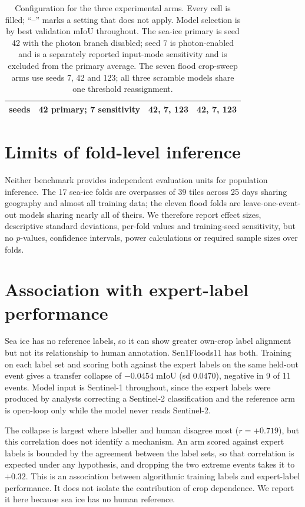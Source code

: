 \documentclass[10pt,twocolumn,letterpaper]{article}
\begin{document}
\begin{table}[t]
\begin{tabular}{llll}
seeds              & 42 primary; 7 sensitivity & 42, 7, 123      & 42, 7, 123 \\
\bottomrule
\end{tabular}
\caption{Configuration for the three experimental arms. Every cell is filled;
``--'' marks a setting that does not apply. Model selection is by best validation
mIoU throughout. The sea-ice
primary is seed 42 with the photon branch disabled; seed 7 is photon-enabled and is
a separately reported input-mode sensitivity and is excluded from the primary average. The seven flood
crop-sweep arms use seeds 7, 42 and 123; all three scramble models share one threshold
reassignment.}
\label{tab:setup}
\end{table}

\section{Limits of fold-level inference}

Neither benchmark provides independent evaluation units for population inference. The 17 sea-ice folds are
overpasses of 39 tiles across 25 days sharing geography and almost all training data;
the eleven flood folds are leave-one-event-out models sharing nearly all of theirs.
We therefore report effect sizes, descriptive standard deviations, per-fold values
and training-seed sensitivity, but no $p$-values, confidence intervals, power
calculations or required sample sizes over folds.

\section{Association with expert-label performance}

Sea ice has no reference labels, so it can show greater own-crop label alignment but
not its relationship to human annotation. Sen1Floods11 has both. Training on each label set and scoring
both against the expert labels on the same held-out event gives a transfer collapse
of $-0.0454$ mIoU (sd $0.0470$), negative in 9 of 11 events. Model input is
Sentinel-1 throughout, since the expert labels
were produced by analysts correcting a Sentinel-2 classification and the reference
arm is open-loop only while the model never reads Sentinel-2.

The collapse is largest where labeller and human disagree most
($r = +0.719$), but this correlation does not identify a mechanism. An
arm scored against expert labels is bounded by the agreement between the label sets,
so that correlation is expected under any hypothesis, and dropping the two extreme
events takes it to $+0.32$. This is an association between algorithmic training
labels and expert-label performance. It does not isolate the contribution of crop
dependence. We report it here because sea ice has no human reference.
\end{document}
